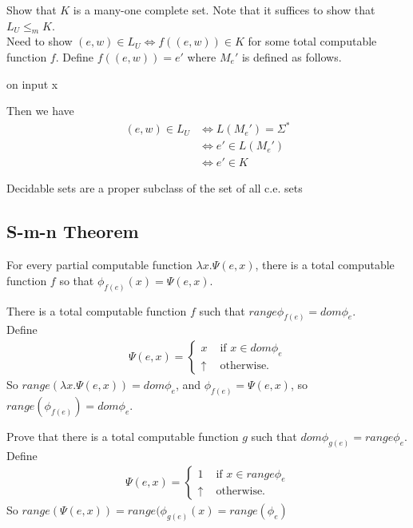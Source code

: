  Show that $K$ is a many-one complete set. Note that it suffices
to show that $L_U \le_m K$.\\
Need to show $(e,w) \in L_U \Leftrightarrow f((e,w)) \in K$ for some total
computable function $f$. Define $f((e,w)) = e'$ where $M_e'$ is defined as
follows.\\
\begin{algorithm}[H]
  on input x\;
\end{algorithm}
Then we have
\begin{align*}
  (e,w) \in L_U & \Leftrightarrow L(M_e')=\Sigma^*\\
  & \Leftrightarrow e' \in L(M_e')\\
  & \Leftrightarrow e' \in K
\end{align*}

Decidable sets are a proper subclass of the set of all c.e. sets

\subsection{S-m-n Theorem}

 For every partial computable function $\lambda x.\Psi(e,x)$,
there is a total computable function $f$ so that $\phi_{f(e)}(x) = \Psi(e,x).$

 There is a total computable function $f$ such that
$range \phi_{f(e)} = dom \phi_e$.\\
Define 
\begin{align*}
  \Psi(e,x)=
  \begin{cases}
    x & \text{ if } x \in dom\phi_e\\
    \uparrow & \text{ otherwise.}
  \end{cases}
\end{align*}
So $range(\lambda x.\Psi(e,x)) = dom\phi_e$, and $\phi_{f(e)}=\Psi(e,x)$, so
$range(\phi_{f(e)}) = dom\phi_e$.

 Prove that there is a total computable function $g$ such that
$dom\phi_{g(e)} = range\phi_e$.\\
Define
\begin{align*}
  \Psi(e,x)=
  \begin{cases}
    1 & \text{ if } x \in range\phi_e\\
    \uparrow & \text{ otherwise.}
  \end{cases}
\end{align*}
So $range(\Psi(e,x)) = range(\phi_{g(e)}(x) = range(\phi_e)$

